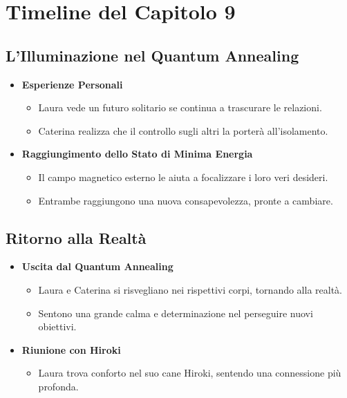 \section*{Timeline del Capitolo 9}

\subsection*{L'Illuminazione nel Quantum Annealing}

\begin{itemize}
    \item \textbf{Esperienze Personali}
    \begin{itemize}
        \item Laura vede un futuro solitario se continua a trascurare le relazioni.
        \item Caterina realizza che il controllo sugli altri la porterà all'isolamento.
    \end{itemize}

    \item \textbf{Raggiungimento dello Stato di Minima Energia}
    \begin{itemize}
        \item Il campo magnetico esterno le aiuta a focalizzare i loro veri desideri.
        \item Entrambe raggiungono una nuova consapevolezza, pronte a cambiare.
    \end{itemize}
\end{itemize}

\subsection*{Ritorno alla Realtà}

\begin{itemize}
    \item \textbf{Uscita dal Quantum Annealing}
    \begin{itemize}
        \item Laura e Caterina si risvegliano nei rispettivi corpi, tornando alla realtà.
        \item Sentono una grande calma e determinazione nel perseguire nuovi obiettivi.
    \end{itemize}

    \item \textbf{Riunione con Hiroki}
    \begin{itemize}
        \item Laura trova conforto nel suo cane Hiroki, sentendo una connessione più profonda.
    \end{itemize}
\end{itemize}

